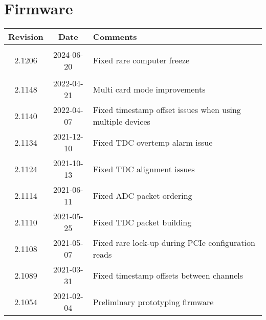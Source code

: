 \section{Firmware} \label{sec:firmware}
\begin{tabularx}{\textwidth}{|c|c|X|}
    \hline
    Revision & Date & Comments\\
    \hline\hline
	\hypertarget{fwrev}{2.1206} & 2024-06-20 & Fixed rare computer freeze\\
	\hline
	2.1148 & 2022-04-21 & Multi card mode improvements\\
	\hline
	2.1140 & 2022-04-07 & Fixed timestamp offset issues when using multiple devices\\
	\hline
	2.1134 & 2021-12-10 & Fixed TDC overtemp alarm issue\\
	\hline
	2.1124 & 2021-10-13 & Fixed TDC alignment issues\\
	\hline
	2.1114 & 2021-06-11 & Fixed ADC packet ordering\\
	\hline
	2.1110 & 2021-05-25 & Fixed TDC packet building\\
	\hline
	2.1108 & 2021-05-07 & Fixed rare lock-up during PCIe configuration reads\\
	\hline
	2.1089 & 2021-03-31 & Fixed timestamp offsets between channels\\
	\hline
    2.1054 & 2021-02-04 & Preliminary prototyping firmware\\
    \hline
\end{tabularx}
